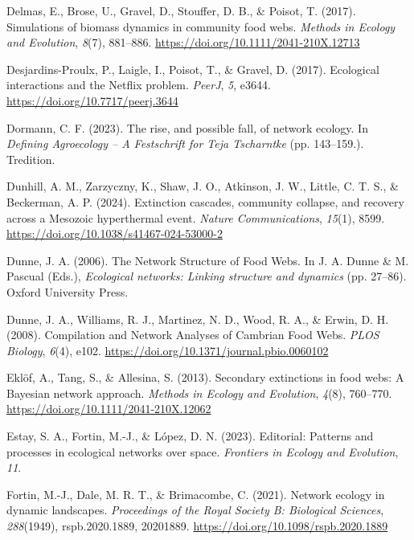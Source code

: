 \documentclass[
]{article}
\newlength{\cslhangindent}
\newenvironment{CSLReferences}[2] %
 {\begin{list}{}{%
  \setlength{\itemindent}{0pt}
  \setlength{\leftmargin}{0pt}
  \setlength{\parsep}{0pt}
  \ifodd #1
   \setlength{\leftmargin}{\cslhangindent}
   \setlength{\itemindent}{-1\cslhangindent}
  \fi
  \setlength{\itemsep}{#2\baselineskip}}}
 {\end{list}}
\begin{document}
\begin{CSLReferences}{1}{0}
Delmas, E., Brose, U., Gravel, D., Stouffer, D. B., \& Poisot, T.
(2017). Simulations of biomass dynamics in community food webs.
\emph{Methods in Ecology and Evolution}, \emph{8}(7), 881--886.
\url{https://doi.org/10.1111/2041-210X.12713}

Desjardins-Proulx, P., Laigle, I., Poisot, T., \& Gravel, D. (2017).
Ecological interactions and the {Netflix} problem. \emph{PeerJ},
\emph{5}, e3644. \url{https://doi.org/10.7717/peerj.3644}

Dormann, C. F. (2023). The rise, and possible fall, of network ecology.
In \emph{Defining {Agroecology} -- {A Festschrift} for {Teja
Tscharntke}} (pp. 143--159.). Tredition.

Dunhill, A. M., Zarzyczny, K., Shaw, J. O., Atkinson, J. W., Little, C.
T. S., \& Beckerman, A. P. (2024). Extinction cascades, community
collapse, and recovery across a {Mesozoic} hyperthermal event.
\emph{Nature Communications}, \emph{15}(1), 8599.
\url{https://doi.org/10.1038/s41467-024-53000-2}

Dunne, J. A. (2006). The {Network Structure} of {Food Webs}. In J. A.
Dunne \& M. Pascual (Eds.), \emph{Ecological networks: {Linking}
structure and dynamics} (pp. 27--86). Oxford University Press.

Dunne, J. A., Williams, R. J., Martinez, N. D., Wood, R. A., \& Erwin,
D. H. (2008). Compilation and {Network Analyses} of {Cambrian Food
Webs}. \emph{PLOS Biology}, \emph{6}(4), e102.
\url{https://doi.org/10.1371/journal.pbio.0060102}

Eklöf, A., Tang, S., \& Allesina, S. (2013). Secondary extinctions in
food webs: A {Bayesian} network approach. \emph{Methods in Ecology and
Evolution}, \emph{4}(8), 760--770.
\url{https://doi.org/10.1111/2041-210X.12062}

Estay, S. A., Fortin, M.-J., \& López, D. N. (2023). Editorial:
{Patterns} and processes in ecological networks over space.
\emph{Frontiers in Ecology and Evolution}, \emph{11}.

Fortin, M.-J., Dale, M. R. T., \& Brimacombe, C. (2021). Network ecology
in dynamic landscapes. \emph{Proceedings of the Royal Society B:
Biological Sciences}, \emph{288}(1949), rspb.2020.1889, 20201889.
\url{https://doi.org/10.1098/rspb.2020.1889}


\end{CSLReferences}
\end{document}
